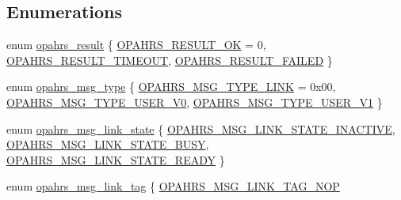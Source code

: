 \subsection*{Enumerations}
\begin{DoxyCompactItemize}
\item 
enum \hyperlink{group___p_i_o_s___o_p_a_h_r_s_gaf6fe64d28ea92983e870494d0a5d05bd}{opahrs\-\_\-result} \{ \hyperlink{group___p_i_o_s___o_p_a_h_r_s_ggaf6fe64d28ea92983e870494d0a5d05bda20bc9bd773d44f8ef0af8b40151b6349}{O\-P\-A\-H\-R\-S\-\_\-\-R\-E\-S\-U\-L\-T\-\_\-\-O\-K} = 0, 
\hyperlink{group___p_i_o_s___o_p_a_h_r_s_ggaf6fe64d28ea92983e870494d0a5d05bda892b46cfe463af918c421464c2809545}{O\-P\-A\-H\-R\-S\-\_\-\-R\-E\-S\-U\-L\-T\-\_\-\-T\-I\-M\-E\-O\-U\-T}, 
\hyperlink{group___p_i_o_s___o_p_a_h_r_s_ggaf6fe64d28ea92983e870494d0a5d05bda7952eace857150eede21d18910af8239}{O\-P\-A\-H\-R\-S\-\_\-\-R\-E\-S\-U\-L\-T\-\_\-\-F\-A\-I\-L\-E\-D}
 \}
\item 
enum \hyperlink{group___p_i_o_s___o_p_a_h_r_s_ga6092fca5dcee8d4bb3dd441183beaa96}{opahrs\-\_\-msg\-\_\-type} \{ \hyperlink{group___p_i_o_s___o_p_a_h_r_s_gga6092fca5dcee8d4bb3dd441183beaa96a44c53299861da5fad274ecff762e374e}{O\-P\-A\-H\-R\-S\-\_\-\-M\-S\-G\-\_\-\-T\-Y\-P\-E\-\_\-\-L\-I\-N\-K} = 0x00, 
\hyperlink{group___p_i_o_s___o_p_a_h_r_s_gga6092fca5dcee8d4bb3dd441183beaa96a93f0bd51b56c8ac4e9ee16e10a767d59}{O\-P\-A\-H\-R\-S\-\_\-\-M\-S\-G\-\_\-\-T\-Y\-P\-E\-\_\-\-U\-S\-E\-R\-\_\-\-V0}, 
\hyperlink{group___p_i_o_s___o_p_a_h_r_s_gga6092fca5dcee8d4bb3dd441183beaa96a18a6404d3c1bb6dbda6821b8cd106259}{O\-P\-A\-H\-R\-S\-\_\-\-M\-S\-G\-\_\-\-T\-Y\-P\-E\-\_\-\-U\-S\-E\-R\-\_\-\-V1}
 \}
\item 
enum \hyperlink{group___p_i_o_s___o_p_a_h_r_s_ga27b2f51b9ebeafdcfa5648d6d6e34074}{opahrs\-\_\-msg\-\_\-link\-\_\-state} \{ \hyperlink{group___p_i_o_s___o_p_a_h_r_s_gga27b2f51b9ebeafdcfa5648d6d6e34074a19a7ed1d0c1db19e66990d51af55c6a0}{O\-P\-A\-H\-R\-S\-\_\-\-M\-S\-G\-\_\-\-L\-I\-N\-K\-\_\-\-S\-T\-A\-T\-E\-\_\-\-I\-N\-A\-C\-T\-I\-V\-E}, 
\hyperlink{group___p_i_o_s___o_p_a_h_r_s_gga27b2f51b9ebeafdcfa5648d6d6e34074a61a53278fed79c320d740937965a8fc6}{O\-P\-A\-H\-R\-S\-\_\-\-M\-S\-G\-\_\-\-L\-I\-N\-K\-\_\-\-S\-T\-A\-T\-E\-\_\-\-B\-U\-S\-Y}, 
\hyperlink{group___p_i_o_s___o_p_a_h_r_s_gga27b2f51b9ebeafdcfa5648d6d6e34074ae7f9ae36337b78399ad0ee6dc238c57c}{O\-P\-A\-H\-R\-S\-\_\-\-M\-S\-G\-\_\-\-L\-I\-N\-K\-\_\-\-S\-T\-A\-T\-E\-\_\-\-R\-E\-A\-D\-Y}
 \}
\item 
enum \hyperlink{group___p_i_o_s___o_p_a_h_r_s_ga8973c96ae9d6e7d40e63cb2bf0a78a79}{opahrs\-\_\-msg\-\_\-link\-\_\-tag} \{ \hyperlink{group___p_i_o_s___o_p_a_h_r_s_gga8973c96ae9d6e7d40e63cb2bf0a78a79a370d599aee0a65ddc1b5cb811c6646bd}{O\-P\-A\-H\-R\-S\-\_\-\-M\-S\-G\-\_\-\-L\-I\-N\-K\-\_\-\-T\-A\-G\-\_\-\-N\-O\-P}

\end{DoxyCompactItemize}
